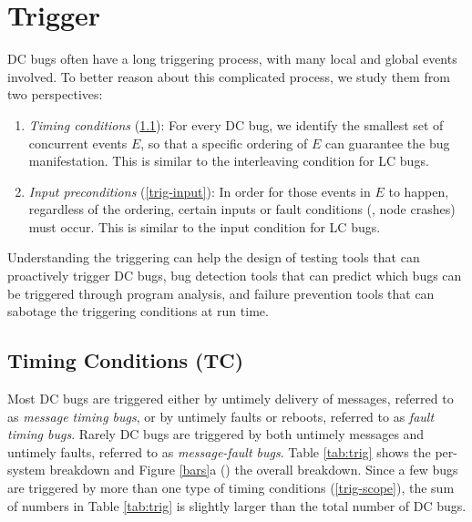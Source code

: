 \section{Trigger}
\label{sec-trig}

DC bugs often have a long triggering process, with many local and
global events involved.  To better reason about this complicated process,
we study them from two
perspectives:

\begin{enumerate}

\item
{\em Timing conditions} (\sec\ref{trig-time}): For every DC bug, we
identify the smallest set of concurrent events $E$, so that a specific
ordering of $E$ can guarantee the bug manifestation.  This is similar
to the interleaving condition for LC bugs.



\item
{\em Input preconditions} (\sec\ref{trig-input}): In order for those
events in $E$ to happen, regardless of the ordering, certain inputs or
fault conditions (\eg, node crashes) must occur.  This is similar to the
input condition for LC bugs.

\end{enumerate}
%
Understanding the triggering can help the design of testing tools
that can proactively trigger DC bugs, bug detection tools that 
can predict which bugs can be triggered through program analysis,
and failure prevention tools that can  sabotage the triggering
conditions at run time.






\subsection{Timing Conditions (TC)}
\label{trig-time}


Most DC bugs are triggered either by untimely delivery of messages,
referred to as {\it message timing bugs}, or by untimely faults or
reboots, referred to as {\it fault timing bugs}.  Rarely DC bugs are
triggered by both untimely messages and untimely faults, referred to
as {\it message-fault bugs}.  Table \ref{tab:trig} shows the
per-system breakdown and Figure \ref{bars}a (\BTMC) the overall
breakdown.  Since a few bugs are triggered by more than one type of
timing conditions
(\sec\ref{trig-scope}), the sum of numbers in Table \ref{tab:trig} is
slightly larger than the total number of DC bugs.

